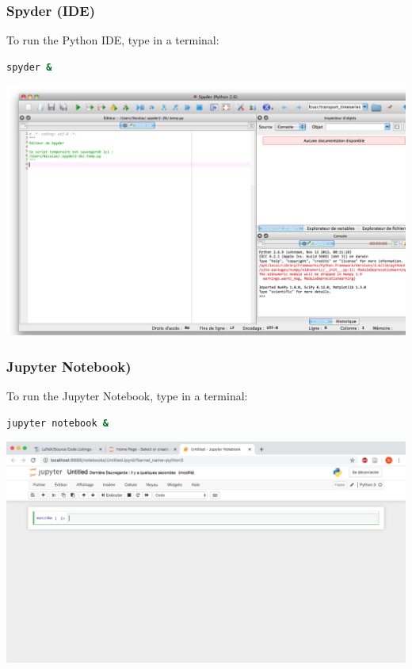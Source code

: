 \begin{frame}[fragile]
    \frametitle{Spyder (IDE)}
To run the Python IDE, type in a terminal:\\
\begin{lstlisting}[language=bash, basicstyle=\ttfamily\scriptsize]
spyder &
\end{lstlisting}
\vspace{-0.5em}
\begin{center}
\includegraphics[scale=0.2]{figs/spyder.png}
\end{center}
\end{frame}

\begin{frame}[fragile]
    \frametitle{Jupyter Notebook)}
To run the Jupyter Notebook, type in a terminal:
\begin{lstlisting}[language=bash, basicstyle=\ttfamily\scriptsize]
jupyter notebook &
\end{lstlisting}
\vspace{-0.5em}
\begin{center}
\includegraphics[scale=0.25]{figs/notebook.png}
\end{center}
\end{frame}

